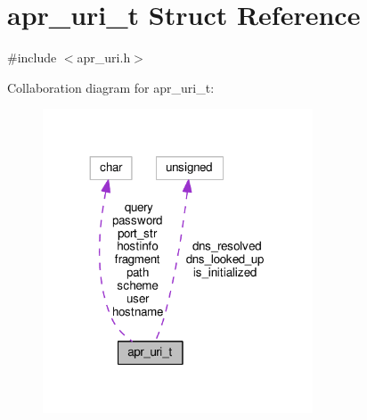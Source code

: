 \hypertarget{structapr__uri__t}{}\section{apr\+\_\+uri\+\_\+t Struct Reference}
\label{structapr__uri__t}


{\ttfamily \#include $<$apr\+\_\+uri.\+h$>$}



Collaboration diagram for apr\+\_\+uri\+\_\+t\+:
\nopagebreak
\begin{figure}[H]
\begin{center}
\leavevmode
\includegraphics[width=227pt]{structapr__uri__t__coll__graph}
\end{center}
\end{figure}
